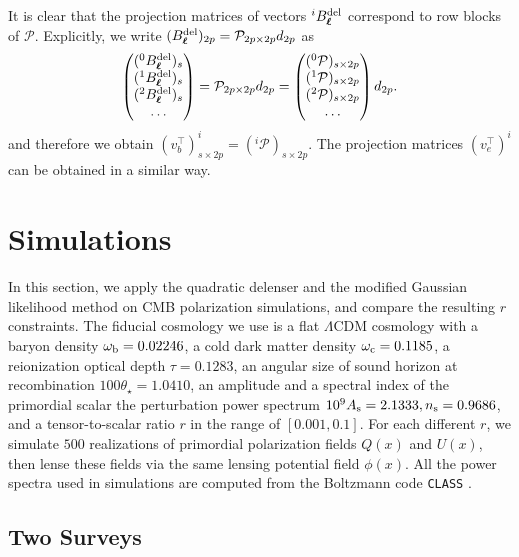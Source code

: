 \documentclass[aps, prd, reprint, nofootinbib, groupedaddress, showpacs]{revtex4-1}
\def\be{\begin{equation}}
\def\ee{\end{equation}}
\newcommand*\Bell{\ensuremath{\boldsymbol\ell}}
\begin{document}
It is clear that the projection matrices of vectors $ ^iB^{\rm del}_{\Bell}$
correspond to row blocks of $\mathcal P$.
Explicitly, we write $(B^{\rm del}_{\Bell})_{2p} = \mathcal P_{2p\times 2p} d_{2p}$ as
\be
\begin{pmatrix}
    (^0B_{\Bell}^{\rm del})_s\\
    (^1B_{\Bell}^{\rm del})_s\\
    (^2B_{\Bell}^{\rm del})_s\\
    \dots
\end{pmatrix}
= \mathcal P_{2p\times 2p} d_{2p}
= \begin{pmatrix}
    (^0\mathcal P)_{s\times 2p}\\
    (^1\mathcal P)_{s\times 2p}\\
    (^2\mathcal P)_{s\times 2p}\\
    \dots
\end{pmatrix} d_{2p}.
\ee
and therefore we obtain $(v_b^\intercal)^i_{s\times 2p} = (^i\mathcal P)_{s\times 2p}$.
The projection matrices $(v_e^\intercal)^i$ can be obtained in a similar way.


\section{Simulations}
\label{sec:sims}
In this section, we apply the quadratic delenser and the modified Gaussian likelihood  method
on CMB polarization simulations, and compare the resulting $r$ constraints.
The fiducial cosmology we use is a flat $\Lambda$CDM cosmology with
a baryon density $\omega_{\rm b} = 0.02246$, a cold dark matter density $\omega_{\rm c} = 0.1185$,
a reionization optical depth $\tau = 0.1283$,
an angular size of sound horizon at recombination $100\theta_{\star} = 1.0410$,
an amplitude and a spectral index of the primordial scalar the perturbation power spectrum
$10^9A_{\rm s} = 2.1333, n_{\rm s} = 0.9686$,
and a tensor-to-scalar ratio $r$ in the range of $[0.001, 0.1]$.
For each different $r$, we simulate $500$ realizations of primordial polarization fields $Q(x)$ and $U(x)$,
then lense these fields via the same lensing potential field $\phi(x)$.
All the power spectra used in simulations are computed from the Boltzmann code  {\tt CLASS} \citep{Lesg2011}.


\subsection{Two Surveys}
\end{document}
